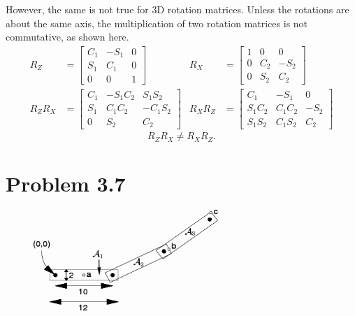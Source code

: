 \documentclass[10pt,letterpaper]{article}
\begin{document}
However, the same is not true for 3D rotation matrices. Unless the rotations are about the same axis, the multiplication of two rotation matrices is not commutative, as shown here. 
\begin{align*}
R_Z &= \begin{bmatrix}
C_1 & -S_1 & 0 \\ 
S_1 &  C_1 & 0 \\ 
0 &  0 & 1
\end{bmatrix} &
R_X &= \begin{bmatrix}
1 & 0 & 0 \\
0 & C_2 & -S_2 \\
0 & S_2 &  C_2 
\end{bmatrix} \\
R_Z R_X &= \begin{bmatrix}
C_1 & -S_1C_2 &  S_1S_2 \\
S_1 &  C_1C_2 & -C_1S_2 \\
  0 &     S_2 &     C_2
\end{bmatrix} &
R_X R_Z &= \begin{bmatrix}
C_1    & -S_1 & 0 \\ 
S_1C_2 &  C_1C_2 &  -S_2 \\
S_1S_2 &  C_1S_2 &   C_2
\end{bmatrix} 
\end{align*}
\begin{equation*}
R_ZR_X \neq R_XR_Z.
\end{equation*}


\section{Problem 3.7}
\begin{figure}[!ht]
\centerline{
\includegraphics[height=1.5in]{img986}
}
\end{figure}
\end{document}
